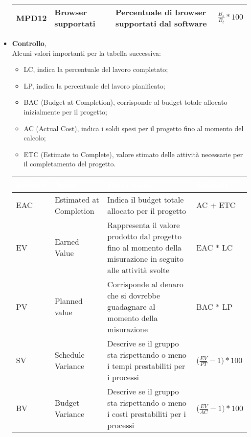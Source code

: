 \begin{itemize}
\begin{center}
\begin{tabular}{|p{1.7cm}|p{3cm}|p{4.5cm}|p{3cm}|}
                  MPD12 & Browser supportati & Percentuale di browser supportati dal software & $\frac{B_s}{B_t}*100$  \\ \hline
                \end{tabular}
            \end{center}
            \renewcommand\arraystretch{1}
            \item \textbf{Controllo},\\
            Alcuni valori importanti per la tabella successiva:
            \begin{itemize}
                \item LC, indica la percentuale del lavoro completato;
                \item LP, indica la percentuale del lavoro pianificato;
                \item BAC (Budget at Completion), corrisponde al budget totale allocato inizialmente per il progetto;
                \item AC (Actual Cost), indica i soldi spesi per il progetto fino al momento del calcolo;
                \item ETC (Estimate to Complete), valore stimato delle attività necessarie per il completamento del progetto.
            \end{itemize}
            \renewcommand\arraystretch{1,5}
            \begin{center}
                \begin{tabular}{|p{1.7cm}|p{3cm}|p{4.5cm}|p{3cm}|} \hline
                  \rowcolor[HTML]{036400}
                  \textcolor[HTML]{FFFFFF}{\textbf{Metrica}} & \textcolor[HTML]{FFFFFF}{\textbf{Nome}} & \textcolor[HTML]{FFFFFF}{\textbf{Descrizione}} & \textcolor[HTML]{FFFFFF}{\textbf{Formula}}    \\ \hline
                  \rowcolor[HTML]{C0C0C0}
                  EAC & Estimated at Completion & Indica il budget totale allocato per il progetto & AC + ETC  \\ \hline
                  \rowcolor[HTML]{EFEFEF}
                  EV & Earned Value & Rappresenta il valore prodotto dal progetto fino al momento della misurazione in seguito alle attività svolte & EAC * LC  \\ \hline
                  \rowcolor[HTML]{C0C0C0}
                  PV & Planned value & Corrisponde al denaro che si dovrebbe guadagnare al momento della misurazione & BAC * LP  \\ \hline
                  \rowcolor[HTML]{EFEFEF}
                  SV & Schedule Variance & Descrive se il gruppo sta rispettando o meno i tempi prestabiliti per i processi & ($\frac{EV}{PT}-1)*100$  \\ \hline
                  \rowcolor[HTML]{C0C0C0}
                  BV & Budget Variance & Descrive se il gruppo sta rispettando o meno i costi prestabiliti per i processi & ($\frac{EV}{AC}-1)*100$   \\ \hline
                \end{tabular}
            \end{center}
            \renewcommand\arraystretch{1}



\end{itemize}

